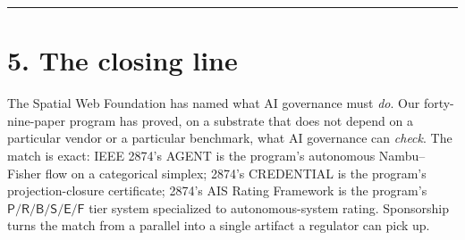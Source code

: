 \documentclass[
  letterpaper,
  11pt]{article}
\theoremstyle{plain}
\theoremstyle{definition}
\theoremstyle{remark}
\begin{document}
\begin{center}\rule{0.5\linewidth}{0.5pt}\end{center}

\section{5. The closing line}\label{the-closing-line}

The Spatial Web Foundation has named what AI governance must \emph{do}. Our forty-nine-paper program has proved, on a substrate that does not depend on a particular vendor or a particular benchmark, what AI governance can \emph{check}. The match is exact: IEEE 2874's AGENT is the program's autonomous Nambu--Fisher flow on a categorical simplex; 2874's CREDENTIAL is the program's projection-closure certificate; 2874's AIS Rating Framework is the program's \(\mathsf{P}/\mathsf{R}/\mathsf{B}/\mathsf{S}/\mathsf{E}/\mathsf{F}\) tier system specialized to autonomous-system rating. Sponsorship turns the match from a parallel into a single artifact a regulator can pick up.
\end{document}
